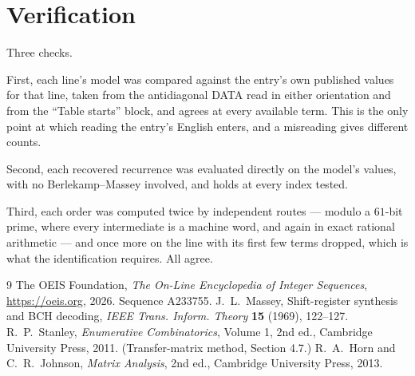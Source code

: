 \documentclass[11pt,a4paper]{article}
\theoremstyle{plain}
\theoremstyle{definition}
\begin{document}
\section{Verification}

Three checks.

First, each line's model was compared against the entry's own published values for that line,
taken from the antidiagonal DATA read in either orientation and from the ``Table starts''
block, and agrees at every available term. This is the only point at which reading the entry's
English enters, and a misreading gives different counts.

Second, each recovered recurrence was evaluated directly on the model's values, with no
Berlekamp--Massey involved, and holds at every index tested.

Third, each order was computed twice by independent routes --- modulo a $61$-bit prime, where
every intermediate is a machine word, and again in exact rational arithmetic --- and once more
on the line with its first few terms dropped, which is what the identification requires. All
agree.

\begin{thebibliography}{9}
 The OEIS Foundation, \emph{The On-Line Encyclopedia of Integer
Sequences}, \url{https://oeis.org}, 2026. Sequence A233755.
 J.~L.~Massey, Shift-register synthesis and BCH decoding, \emph{IEEE
Trans. Inform. Theory} \textbf{15} (1969), 122--127.
 R.~P.~Stanley, \emph{Enumerative Combinatorics}, Volume 1, 2nd ed.,
Cambridge University Press, 2011. (Transfer-matrix method, Section 4.7.)
 R.~A.~Horn and C.~R.~Johnson, \emph{Matrix Analysis}, 2nd ed., Cambridge
University Press, 2013.
\end{thebibliography}
\end{document}
